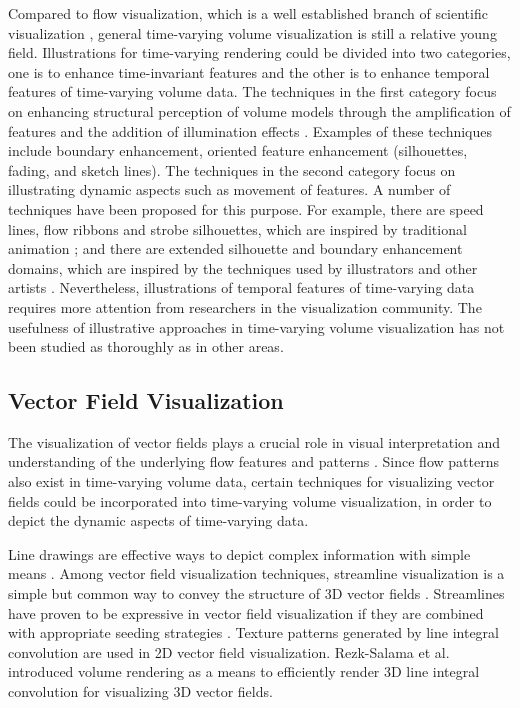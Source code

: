 Compared to flow visualization, which is a well established branch of scientific visualization \cite{brambilla_illustrative_2012}, general time-varying volume visualization is still a relative young field.
Illustrations for time-varying rendering could be divided into two categories, one is to enhance time-invariant features and the other is to enhance temporal features of time-varying volume data. The techniques in the first category focus on enhancing structural perception of volume models through the amplification of features and the addition of illumination effects \cite{rheingans_volume_2001} \cite{joshi_illustration-inspired_2005}. Examples of these techniques include boundary enhancement, oriented feature enhancement (silhouettes, fading, and sketch lines). The techniques in the second category focus on illustrating dynamic aspects such as movement of features. A number of techniques have been proposed for this purpose. For example, there are speed lines, flow ribbons and strobe silhouettes, which are inspired by traditional animation \cite{joshi_illustration-inspired_2005} \cite{joshi_evaluation_2008} \cite{joshi_case_2009}; and there are extended silhouette and boundary enhancement domains, which are inspired by the techniques used by illustrators and other artists \cite{svakhine_illustration_2005}. Nevertheless, illustrations of temporal features of time-varying data requires more attention from researchers in the visualization community. The usefulness of illustrative approaches in time-varying volume visualization has not been studied as thoroughly as in other areas.

\subsection{Vector Field Visualization}
The visualization of vector fields plays a crucial role in visual interpretation and understanding of the underlying flow features and patterns \cite{kuhn_clustering-based_2011} \cite{ma_coherent_2013}. Since flow patterns also exist in time-varying volume data, certain techniques for visualizing vector fields could be incorporated into time-varying volume visualization, in order to depict the dynamic aspects of time-varying data.

Line drawings are effective ways to depict complex information with simple means \cite{benard_state---art_2011}.
Among vector field visualization techniques, streamline visualization is a simple but common way to convey the structure of 3D vector fields \cite{chen_illustrative_2011}.
Streamlines have proven to be expressive in vector field visualization if they are combined with appropriate seeding strategies \cite{annen_vector_2008}.
Texture patterns generated by line integral convolution are used in 2D vector field visualization. Rezk-Salama et al. \cite{rezk-salama_interactive_1999} introduced volume rendering as a means to efficiently render 3D line integral convolution for visualizing 3D vector fields.

